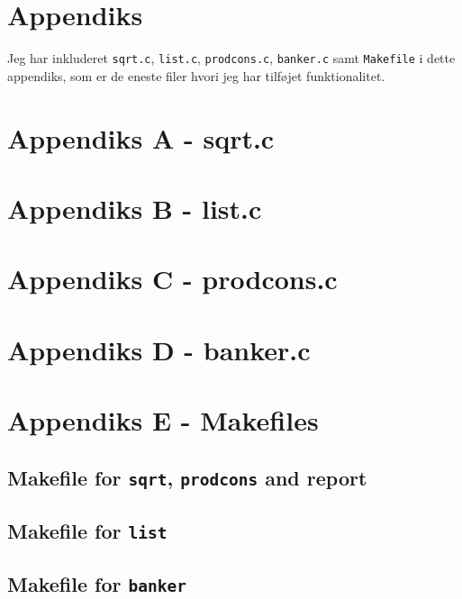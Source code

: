 \documentclass{article}
\begin{document}
\newpage

\section*{Appendiks}
Jeg har inkluderet \texttt{sqrt.c}, \texttt{list.c}, \texttt{prodcons.c}, \texttt{banker.c} samt \texttt{Makefile} i dette appendiks, som er de eneste filer hvori jeg har tilføjet funktionalitet.

\section*{Appendiks A - sqrt.c} \label{sec:sqrtcode}


\newpage
\section*{Appendiks B - list.c} \label{sec:listcode}


\newpage
\section*{Appendiks C - prodcons.c} \label{sec:prodconscode}


\newpage
\section*{Appendiks D - banker.c} \label{sec:bankercode}


\newpage 

\section*{Appendiks E - Makefiles}
\subsection*{Makefile for \texttt{sqrt}, \texttt{prodcons} and report}

\subsection*{Makefile for \texttt{list}}

\subsection*{Makefile for \texttt{banker}}


\label{lastPage}
\end{document}
